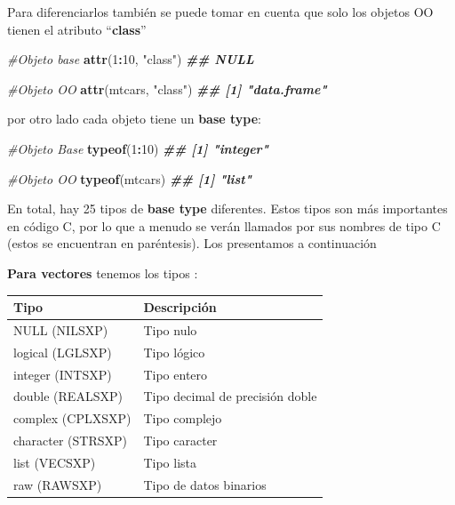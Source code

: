 \documentclass[
]{book}
\newenvironment{Shaded}{\begin{snugshade}}{\end{snugshade}}
\newcommand{\CommentTok}[1]{\textcolor[rgb]{0.56,0.35,0.01}{\textit{#1}}}
\newcommand{\DecValTok}[1]{\textcolor[rgb]{0.00,0.00,0.81}{#1}}
\newcommand{\DocumentationTok}[1]{\textcolor[rgb]{0.56,0.35,0.01}{\textbf{\textit{#1}}}}
\newcommand{\FunctionTok}[1]{\textcolor[rgb]{0.13,0.29,0.53}{\textbf{#1}}}
\newcommand{\NormalTok}[1]{#1}
\newcommand{\SpecialCharTok}[1]{\textcolor[rgb]{0.81,0.36,0.00}{\textbf{#1}}}
\newcommand{\StringTok}[1]{\textcolor[rgb]{0.31,0.60,0.02}{#1}}
\begin{document}
Para diferenciarlos también se puede tomar en cuenta que solo los objetos OO tienen el atributo ``\textbf{class}''

\begin{Shaded}
\begin{Highlighting}[]
\CommentTok{\#Objeto base}
\FunctionTok{attr}\NormalTok{(}\DecValTok{1}\SpecialCharTok{:}\DecValTok{10}\NormalTok{, }\StringTok{"class"}\NormalTok{)}
\DocumentationTok{\#\# NULL}


\CommentTok{\#Objeto OO}
\FunctionTok{attr}\NormalTok{(mtcars, }\StringTok{"class"}\NormalTok{)}
\DocumentationTok{\#\# [1] "data.frame"}
\end{Highlighting}
\end{Shaded}

por otro lado cada objeto tiene un \textbf{base type}:

\begin{Shaded}
\begin{Highlighting}[]
\CommentTok{\#Objeto Base}
\FunctionTok{typeof}\NormalTok{(}\DecValTok{1}\SpecialCharTok{:}\DecValTok{10}\NormalTok{)}
\DocumentationTok{\#\# [1] "integer"}


\CommentTok{\#Objeto OO}
\FunctionTok{typeof}\NormalTok{(mtcars)}
\DocumentationTok{\#\# [1] "list"}
\end{Highlighting}
\end{Shaded}

En total, hay 25 tipos de \textbf{base type} diferentes. Estos tipos son más importantes en código C, por lo que a menudo se verán llamados por sus nombres de tipo C (estos se encuentran en paréntesis). Los presentamos a continuación

\textbf{Para vectores} tenemos los tipos :

\begin{longtable}[]{@{}ll@{}}
\toprule\noalign{}
Tipo & Descripción \\
\midrule\noalign{}
\endhead
\bottomrule\noalign{}
\endlastfoot
NULL (NILSXP) & Tipo nulo \\
logical (LGLSXP) & Tipo lógico \\
integer (INTSXP) & Tipo entero \\
double (REALSXP) & Tipo decimal de precisión doble \\
complex (CPLXSXP) & Tipo complejo \\
character (STRSXP) & Tipo caracter \\
list (VECSXP) & Tipo lista \\
raw (RAWSXP) & Tipo de datos binarios \\
\end{longtable}
\end{document}
